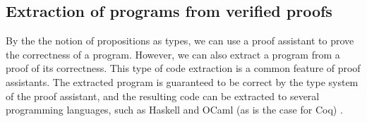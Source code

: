 \subsection{Extraction of programs from verified proofs}
\label{ssec:extraction_of_programs_from_verified_proofs}

By the the notion of propositions as types, we can use a proof assistant to
prove the correctness of a program. However, we can also extract a program from
a proof of its correctness. This type of code extraction is a common feature of proof assistants.
The extracted program is guaranteed to be correct by the type system of the proof assistant,
and the resulting code can be extracted to several programming languages, such as Haskell and OCaml (as is the case for Coq) \cite{cintro}.
